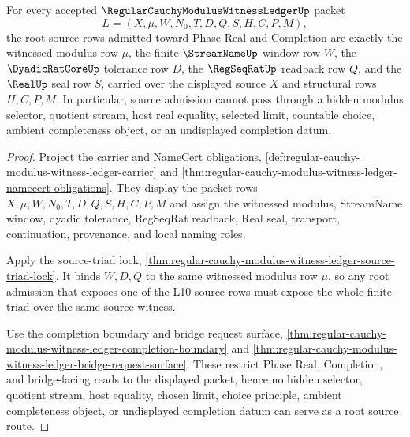 \begin{theorem}
\label{thm:regular-cauchy-modulus-witness-ledger-root-source-admission}
For every accepted $\RegularCauchyModulusWitnessLedgerUp$ packet
$$
L=(X,\mu,W,N_0,T,D,Q,S,H,C,P,M),
$$
the root source rows admitted toward Phase Real and Completion are exactly the witnessed modulus row $\mu$, the finite $\StreamNameUp$ window row $W$, the $\DyadicRatCoreUp$ tolerance row $D$, the $\RegSeqRatUp$ readback row $Q$, and the $\RealUp$ seal row $S$, carried over the displayed source $X$ and structural rows $H,C,P,M$. In particular, source admission cannot pass through a hidden modulus selector, quotient stream, host real equality, selected limit, countable choice, ambient completeness object, or an undisplayed completion datum.
\end{theorem}
\begin{proof}
Project the carrier and NameCert obligations, \autoref{def:regular-cauchy-modulus-witness-ledger-carrier} and \autoref{thm:regular-cauchy-modulus-witness-ledger-namecert-obligations}. They display the packet rows $X,\mu,W,N_0,T,D,Q,S,H,C,P,M$ and assign the witnessed modulus, StreamName window, dyadic tolerance, RegSeqRat readback, Real seal, transport, continuation, provenance, and local naming roles.

Apply the source-triad lock, \autoref{thm:regular-cauchy-modulus-witness-ledger-source-triad-lock}. It binds $W,D,Q$ to the same witnessed modulus row $\mu$, so any root admission that exposes one of the L10 source rows must expose the whole finite triad over the same source witness.

Use the completion boundary and bridge request surface, \autoref{thm:regular-cauchy-modulus-witness-ledger-completion-boundary} and \autoref{thm:regular-cauchy-modulus-witness-ledger-bridge-request-surface}. These restrict Phase Real, Completion, and bridge-facing reads to the displayed packet, hence no hidden selector, quotient stream, host equality, chosen limit, choice principle, ambient completeness object, or undisplayed completion datum can serve as a root source route.
\end{proof}


